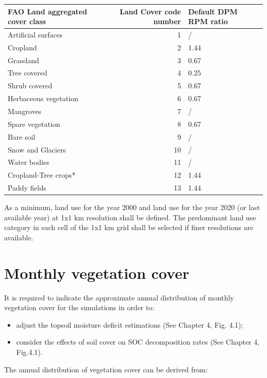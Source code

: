 \documentclass[
  10pt,
  b5paper,
]{book}
\providecommand{\tightlist}{%
  \setlength{\itemsep}{0pt}\setlength{\parskip}{0pt}}
\begin{document}
\begin{table}
\centering
\begin{tabular}{l|r|l}
\hline
FAO Land aggregated  cover class & Land Cover code number & Default DPM RPM ratio\\
\hline
Artificial surfaces & 1 & /\\
\hline
Cropland & 2 & 1.44\\
\hline
Grassland & 3 & 0.67\\
\hline
Tree covered & 4 & 0.25\\
\hline
Shrub covered & 5 & 0.67\\
\hline
Herbaceous vegetation & 6 & 0.67\\
\hline
Mangroves & 7 & /\\
\hline
Spare vegetation & 8 & 0.67\\
\hline
Bare soil & 9 & /\\
\hline
Snow and Glaciers & 10 & /\\
\hline
Water bodies & 11 & /\\
\hline
Cropland-Tree crops* & 12 & 1.44\\
\hline
Paddy fields & 13 & 1.44\\
\hline
\end{tabular}
\end{table}

As a minimum, land use for the year 2000 and land use for the year 2020 (or last available year) at 1x1 km resolution shall be defined. The predominant land use category in each cell of the 1x1 km grid shall be selected if finer resolutions are available.

\hypertarget{monthly-vegetation-cover}{%
\section{Monthly vegetation cover}\label{monthly-vegetation-cover}}

It is required to indicate the approximate annual distribution of monthly vegetation cover for the simulations in order to:

\begin{itemize}
\tightlist
\item
  adjust the topsoil moisture deficit estimations (See Chapter 4, Fig. 4.1);
\item
  consider the effects of soil cover on SOC decomposition rates (See Chapter 4, Fig.4.1).
\end{itemize}

The annual distribution of vegetation cover can be derived from:
\end{document}
